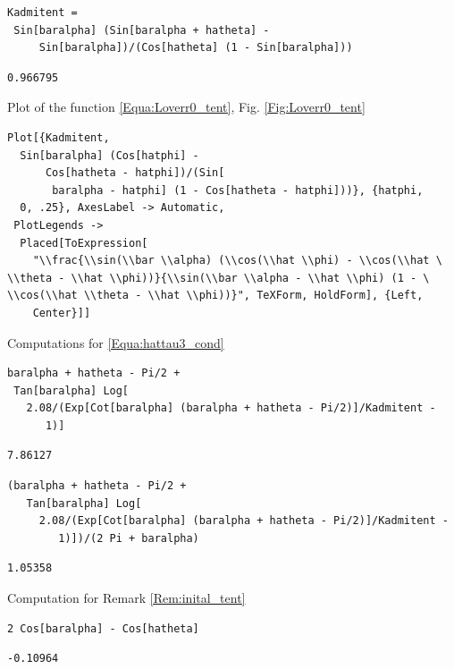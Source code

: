 \documentclass[reqno]{amsart}
\theoremstyle{definition} \newtheorem{definition}{Definition}[section]
\theoremstyle{definition} \newtheorem{remark}[definition]{Remark}
\theoremstyle{plain} \newtheorem{lemma}[definition]{Lemma}
\theoremstyle{plain} \newtheorem{proposition}[definition]{Proposition}
\theoremstyle{plain} \newtheorem{theorem}[definition]{Theorem}
\theoremstyle{plain} \newtheorem{corollary}[definition]{Corollary}
\theoremstyle{definition} \newtheorem{example}[definition]{Example}
\theoremstyle{plain} \newtheorem{claim}[clai]{Claim}
\theoremstyle{definition} \newtheorem{assumption}[definition]{Assumption}
\theoremstyle{definition} \newtheorem{observation}[definition]{Observation}
\newcommand{\1}{\mathbbm 1}
\newcommand{\smed}{\medskip}
\numberwithin{equation}{section} %
\theoremstyle{plain} \newtheorem*{theorem*}{Theorem}
\theoremstyle{plain} \newtheorem{mthm}[maintheorem]{Main Theorem}
\theoremstyle{plain} \newtheorem*{mthm*}{Main Theorem}
\theoremstyle{plain} \newtheorem*{conjecture*}{Conjecture}
\theoremstyle{plain} \newtheorem{conjecture}[definition]{Conjecture}
\theoremstyle{plain} \newtheorem*{problem*}{Problem}
\begin{document}
\begin{verbatim}
Kadmitent = 
 Sin[baralpha] (Sin[baralpha + hatheta] - 
     Sin[baralpha])/(Cos[hatheta] (1 - Sin[baralpha]))
\end{verbatim}
\begin{verbatim}
0.966795
\end{verbatim}
\smed
Plot of the function \eqref{Equa:Loverr0_tent}, Fig. \ref{Fig:Loverr0_tent}
\smed
\begin{verbatim}
Plot[{Kadmitent, 
  Sin[baralpha] (Cos[hatphi] - 
      Cos[hatheta - hatphi])/(Sin[
       baralpha - hatphi] (1 - Cos[hatheta - hatphi]))}, {hatphi, 
  0, .25}, AxesLabel -> Automatic, 
 PlotLegends -> 
  Placed[ToExpression[
    "\\frac{\\sin(\\bar \\alpha) (\\cos(\\hat \\phi) - \\cos(\\hat \
\\theta - \\hat \\phi))}{\\sin(\\bar \\alpha - \\hat \\phi) (1 - \
\\cos(\\hat \\theta - \\hat \\phi))}", TeXForm, HoldForm], {Left, 
    Center}]]
\end{verbatim}
\smed
Computations for \eqref{Equa:hattau3_cond}
\smed
\begin{verbatim}
baralpha + hatheta - Pi/2 + 
 Tan[baralpha] Log[
   2.08/(Exp[Cot[baralpha] (baralpha + hatheta - Pi/2)]/Kadmitent - 
      1)]
\end{verbatim}
\begin{verbatim}
7.86127
\end{verbatim}
\begin{verbatim}
(baralpha + hatheta - Pi/2 + 
   Tan[baralpha] Log[
     2.08/(Exp[Cot[baralpha] (baralpha + hatheta - Pi/2)]/Kadmitent - 
        1)])/(2 Pi + baralpha)
\end{verbatim}
\begin{verbatim}
1.05358
\end{verbatim}
Computation for Remark \ref{Rem:inital_tent}
\smed
\begin{verbatim}
2 Cos[baralpha] - Cos[hatheta]
\end{verbatim}
\begin{verbatim}
-0.10964
\end{verbatim}
\end{document}
